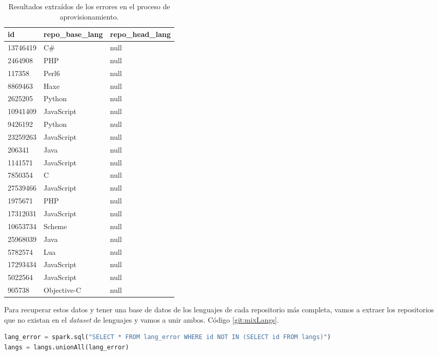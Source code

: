 \begin{table}[htp!]
	\centering
	\caption{Resultados extraídos de los errores en el proceso de aprovisionamiento.}
	\label{langError}
	\begin{tabular}{|l|l|l|}
		\hline
		\textbf{id}       & \textbf{repo\_base\_lang} & \textbf{repo\_head\_lang}  \\ \hline
		13746419 & C\#              & null  \\
		2464908  & PHP              & null  \\
		117358   & Perl6            & null  \\
		8869463  & Haxe             & null  \\
		2625205  & Python           & null  \\
		10941409 & JavaScript       & null  \\
		9426192  & Python           & null  \\
		23259263 & JavaScript       & null  \\
		206341   & Java             & null  \\
		1141571  & JavaScript       & null  \\
		7850354  & C                & null  \\
		27539466 & JavaScript       & null  \\
		1975671  & PHP              & null  \\
		17312031 & JavaScript       & null  \\
		10653734 & Scheme           & null  \\
		25968039 & Java             & null  \\
		5782574  & Lua              & null  \\
		17293434 & JavaScript       & null  \\
		5022564  & JavaScript       & null  \\
		905738   & Objective-C      & null  \\ \hline
	\end{tabular}
\end{table}

Para recuperar estos datos y tener una base de datos de los lenguajes de cada repositorio más completa, vamos a extraer los repositorios que no existan en el \textit{dataset} de lenguajes y vamos a unir ambos. Código \ref{git:mixLangs}.

\begin{lstlisting}[label=git:mixLangs,language=python,frame=single,caption={Creación de un \textit{DataFrame} diferencial de lenguajes y unión de ambas.}]
lang_error = spark.sql("SELECT * FROM lang_error WHERE id NOT IN (SELECT id FROM langs)")
langs = langs.unionAll(lang_error)
\end{lstlisting}

